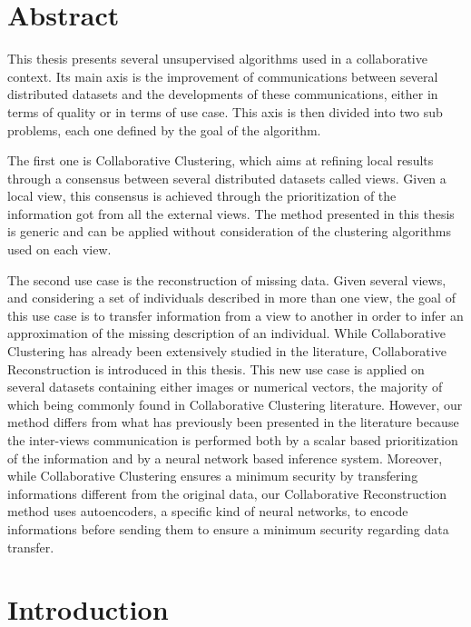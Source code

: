 \chapter{Abstract}

This thesis presents several unsupervised algorithms used in a collaborative context. Its main axis is the improvement of communications between several distributed datasets and the developments of these communications, either in terms of quality or in terms of use case. This axis is then divided into two sub problems, each one defined by the goal of the algorithm.

The first one is Collaborative Clustering, which aims at refining local results through a consensus between several distributed datasets called views. Given a local view, this consensus is achieved through the prioritization of the information got from all the external views. The method presented in this thesis is generic and can be applied without consideration of the clustering algorithms used on each view.

The second use case is the reconstruction of missing data. Given several views, and considering a set of individuals described in more than one view, the goal of this use case is to transfer information from a view to another in order to infer an approximation of the missing description of an individual. While Collaborative Clustering has already been extensively studied in the literature, Collaborative Reconstruction is introduced in this thesis. This new use case is applied on several datasets containing either images or numerical vectors, the majority of which being commonly found in Collaborative Clustering literature. However, our method differs from what has previously been presented in the literature because the inter-views communication is performed both by a scalar based prioritization of the information and by a neural network based inference system. Moreover, while Collaborative Clustering ensures a minimum security by transfering informations different from the original data, our Collaborative Reconstruction method uses autoencoders, a specific kind of neural networks, to encode informations before sending them to ensure a minimum security regarding data transfer.

\chapter{Introduction}

\minitoc{}
\newpage

